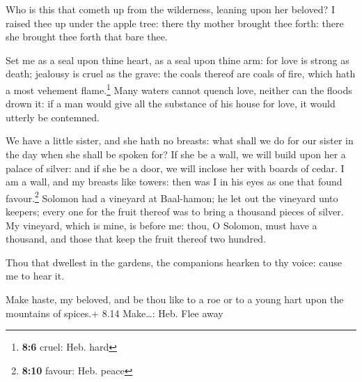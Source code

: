  Who is this that cometh up from the wilderness, leaning
upon her beloved? I raised thee up under the apple tree: there thy
mother brought thee forth: there she brought thee forth that bare thee.

 Set me as a seal upon thine heart, as a seal upon thine
arm: for love is strong as death; jealousy is cruel as the grave: the
coals thereof are coals of fire, which hath a most vehement
flame.\footnote{\textbf{8:6} cruel: Heb. hard}  Many
waters cannot quench love, neither can the floods drown it: if a man
would give all the substance of his house for love, it would utterly be
contemned.

 We have a little sister, and she hath no breasts: what
shall we do for our sister in the day when she shall be spoken for?
 If she be a wall, we will build upon her a palace of
silver: and if she be a door, we will inclose her with boards of cedar.
 I am a wall, and my breasts like towers: then was I in
his eyes as one that found favour.\footnote{\textbf{8:10} favour: Heb.
  peace}  Solomon had a vineyard at Baal-hamon; he let
out the vineyard unto keepers; every one for the fruit thereof was to
bring a thousand pieces of silver.  My vineyard, which is
mine, is before me: thou, O Solomon, must have a thousand, and those
that keep the fruit thereof two hundred.

 Thou that dwellest in the gardens, the companions
hearken to thy voice: cause me to hear it.

 Make haste, my beloved, and be thou like to a roe or to
a young hart upon the mountains of spices.+ 8.14 Make\ldots: Heb. Flee
away
